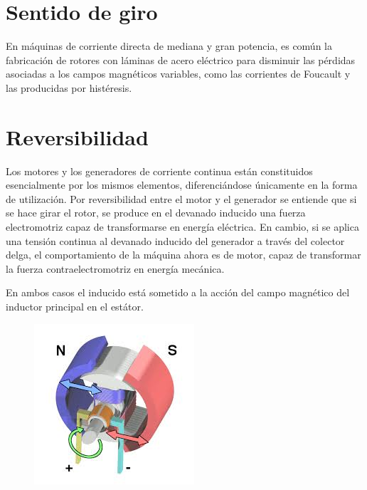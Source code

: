 \documentclass[12pt,a4paper]{article}
\begin{document}
\section{Sentido de giro}
En máquinas de corriente directa de mediana y gran potencia, es común la fabricación de rotores con láminas de acero eléctrico para disminuir las pérdidas asociadas a los campos magnéticos variables, como las corrientes de Foucault y las producidas por histéresis.
\newpage
\section{Reversibilidad}
Los motores y los generadores de corriente continua están constituidos esencialmente por los mismos elementos, diferenciándose únicamente en la forma de utilización. Por reversibilidad entre el motor y el generador se entiende que si se hace girar el rotor, se produce en el devanado inducido una fuerza electromotriz capaz de transformarse en energía eléctrica. En cambio, si se aplica una tensión continua al devanado inducido del generador a través del colector delga, el comportamiento de la máquina ahora es de motor, capaz de transformar la fuerza contraelectromotriz en energía mecánica.

En ambos casos el inducido está sometido a la acción del campo magnético del inductor principal en el estátor.
\begin{figure}[h!]
\centering
\includegraphics[scale=1]{images.png} 

\end{figure}
\end{document}
